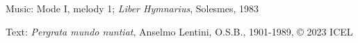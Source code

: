 




\begin{hymnsource}
Music: Mode I, melody 1; \emph{Liber Hymnarius}, Solesmes, 1983

Text: \emph{Pergrata mundo nuntiat}, Anselmo Lentini, O.S.B., 1901-1989, © 2023 ICEL
\end{hymnsource}
